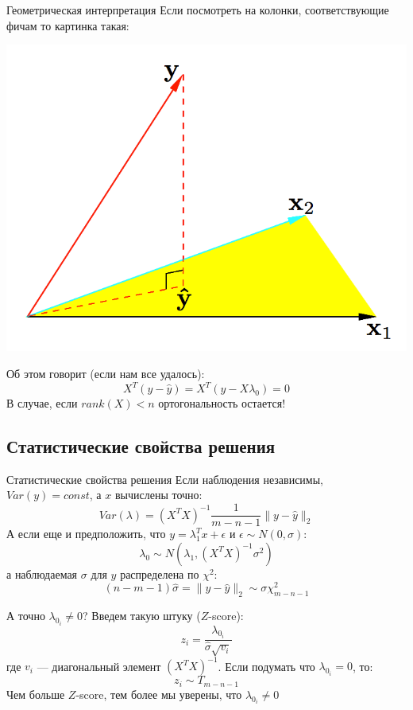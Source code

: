 \documentclass[14pt, fleqn, xcolor={dvipsnames, table}]{beamer}
\begin{document}
\begin{frame}{Геометрическая интерпретация}
Если посмотреть на колонки, соответствующие фичам то картинка такая:
\begin{center}
\includegraphics[height=0.5\textheight]{3_2.png}
\end{center}
Об этом говорит (если нам все удалось):
$$
X^T(y - \hat{y}) = X^T(y - X\lambda_0) = 0
$$
В случае, если $rank(X) < n$ ортогональность остается!
\end{frame}

\subsection{Статистические свойства решения}
\begin{frame}{Статистические свойства решения}
Если наблюдения независимы, $Var(y) = const$, а $x$ вычислены точно:
$$
Var(\lambda) = \left(X^TX\right)^{-1}\frac{1}{m - n - 1}\|y - \hat{y}\|_2
$$
А если еще и предположить, что $y=\lambda_1^Tx + \epsilon$ и $\epsilon \sim N(0,\sigma)$:
$$
\lambda_0 \sim N(\lambda_1, \left(X^TX\right)^{-1}\sigma^2)
$$
а наблюдаемая $\sigma$ для $y$ распределена по $\chi^2$:
$$
(n-m-1)\hat{\sigma} = \|y - \hat{y}\|_2 \sim \sigma \chi^2_{m-n-1}
$$
\end{frame}

\begin{frame}{А точно $\lambda_{0_i} \ne 0$?}
Введем такую штуку ($Z$-score):
$$
z_i = \frac{\lambda_{0_i}}{\hat{\sigma}\sqrt{v_i}}
$$
где $v_i$ --- диагональный элемент $\left(X^TX\right)^{-1}$. Если подумать что $\lambda_{0_i} = 0$, то:
$$
z_i \sim T_{m-n-1}
$$
Чем больше $Z$-score, тем более мы уверены, что $\lambda_{0_i} \ne 0$
\end{frame}
\end{document}
